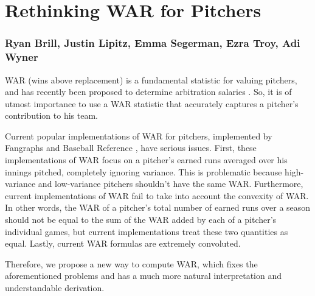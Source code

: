 \documentclass[12pt]{article}
\begin{document}
\section*{Rethinking WAR for Pitchers}

\subsubsection*{Ryan Brill, Justin Lipitz, Emma Segerman, Ezra Troy, Adi Wyner}

WAR (wins above replacement) is a fundamental statistic for valuing pitchers, and has recently been proposed to determine arbitration salaries \cite{war_arb}. So, it is of utmost importance to use a WAR statistic that accurately captures a pitcher's contribution to his team. 

Current popular implementations of WAR for pitchers, implemented by Fangraphs \cite{war_FG} and Baseball Reference \cite{war_BR}, have serious issues.  First, these implementations of WAR focus on a pitcher's earned runs averaged over his innings pitched, completely ignoring variance. This is problematic because high-variance and low-variance pitchers shouldn't have the same WAR. Furthermore, current implementations of WAR fail to take into account the convexity of WAR. In other words, the WAR of a pitcher's total number of earned runs over a season should not be equal to the sum of the WAR added by each of a pitcher's individual games, but current implementations treat these two quantities as equal. Lastly, current WAR formulas are extremely convoluted. 




Therefore, we propose a new way to compute WAR, which fixes the aforementioned problems and has a much more natural interpretation and understandable derivation.
\end{document}
